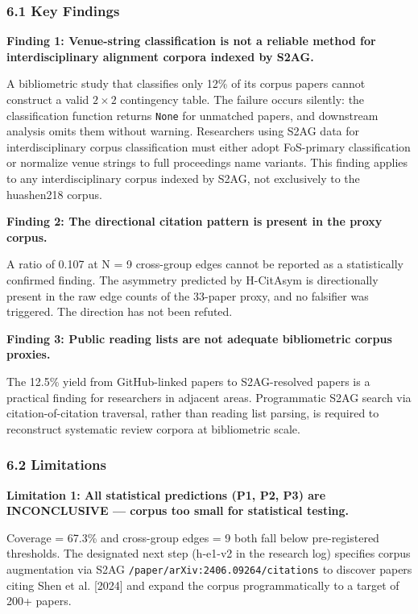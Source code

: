 
\subsubsection{6.1 Key Findings}

\textbf{Finding 1: Venue-string classification is not a reliable method for interdisciplinary alignment corpora indexed by S2AG.}

A bibliometric study that classifies only 12\% of its corpus papers cannot construct a valid $2\times 2$ contingency table. The failure occurs silently: the classification function returns \texttt{None} for unmatched papers, and downstream analysis omits them without warning. Researchers using S2AG data for interdisciplinary corpus classification must either adopt FoS-primary classification or normalize venue strings to full proceedings name variants. This finding applies to any interdisciplinary corpus indexed by S2AG, not exclusively to the huashen218 corpus.

\textbf{Finding 2: The directional citation pattern is present in the proxy corpus.}

A ratio of 0.107 at N = 9 cross-group edges cannot be reported as a statistically confirmed finding. The asymmetry predicted by H-CitAsym is directionally present in the raw edge counts of the 33-paper proxy, and no falsifier was triggered. The direction has not been refuted.

\textbf{Finding 3: Public reading lists are not adequate bibliometric corpus proxies.}

The 12.5\% yield from GitHub-linked papers to S2AG-resolved papers is a practical finding for researchers in adjacent areas. Programmatic S2AG search via citation-of-citation traversal, rather than reading list parsing, is required to reconstruct systematic review corpora at bibliometric scale.

\subsubsection{6.2 Limitations}

\textbf{Limitation 1: All statistical predictions (P1, P2, P3) are INCONCLUSIVE --- corpus too small for statistical testing.}

Coverage = 67.3\% and cross-group edges = 9 both fall below pre-registered thresholds. The designated next step (h-e1-v2 in the research log) specifies corpus augmentation via S2AG \texttt{/paper/arXiv:2406.09264/citations} to discover papers citing Shen et al. [2024] and expand the corpus programmatically to a target of 200+ papers.

